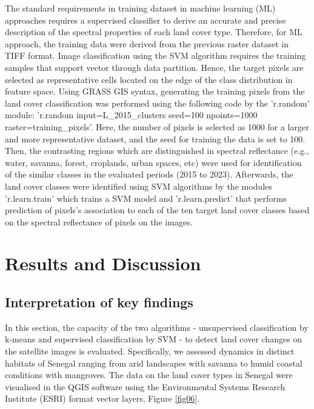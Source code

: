 \documentclass[earth,article,submit,pdftex,moreauthors]{Definitions/mdpi}
\begin{document}
{The standard requirements in training dataset in machine learning (ML) approaches requires a supervised classifier to derive an accurate and precise description of the spectral properties of each land cover type. Therefore, for ML approach, the training data were derived from the previous raster dataset in TIFF format. Image classification using the SVM algorithm requires the training samples that support vector through data partition. Hence, the target pixels are selected as representative cells located on the edge of the class distribution in feature space. Using GRASS GIS syntax, generating the training pixels from the land cover classification was performed using the following code by the 'r.random' module: 'r.random input=L\_2015\_clusters seed=100 npoints=1000 raster=training\_pixels'. Here, the number of pixels is selected as 1000 for a larger and more representative dataset, and the seed for training the data is set to 100. Then, the contrasting regions which are distinguished in spectral reflectance (e.g., water, savanna, forest, croplands, urban spaces, etc) were used for identification of the similar classes in the evaluated periods (2015 to 2023). Afterwards, the land cover classes were identified using SVM algorithms by the modules 'r.learn.train' which trains a SVM model and 'r.learn.predict' that performs prediction of pixels's association to each of the ten target land cover classes based on the spectral reflectance of pixels on the images.}

\section{Results and Discussion}

\subsection{{Interpretation of key findings}}

{In this section, the capacity of the two algorithms - unsupervised classification by k-means and supervised classification by SVM - to detect land cover changes on the satellite images is evaluated. Specifically, we assessed dynamics in distinct habitats of Senegal ranging from arid landscapes with savanna to humid coastal conditions with mangroves. }The data on the land cover types in Senegal{ were} visualised in the QGIS software using the Environmental Systems Research Institute (ESRI) format vector layers, Figure \ref{fig06}. 
\end{document}
